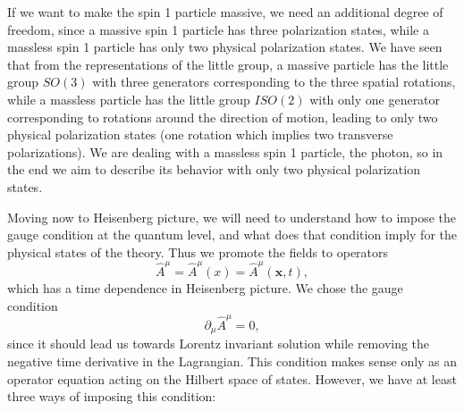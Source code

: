 If we want to make the spin 1 particle massive, we need an additional degree of freedom, since a massive spin 1 particle has three polarization states, while a massless spin 1 particle has only two physical polarization states. We have seen that from the representations of the little group, a massive particle has the little group \(SO(3)\) with three generators corresponding to the three spatial rotations, while a massless particle has the little group \(ISO(2)\) with only one generator corresponding to rotations around the direction of motion, leading to only two physical polarization states (one rotation which implies two transverse polarizations). We are dealing with a massless spin 1 particle, the photon, so in the end we aim to describe its behavior with only two physical polarization states.

Moving now to Heisenberg picture, we will need to understand how to impose the gauge condition at the quantum level, and what does that condition imply for the physical states of the theory. Thus we promote the fields to operators
\[
    \hat{A}^{\mu} = \hat{A}^{\mu}(x) = \hat{A}^{\mu}(\mathbf{x}, t),
\]
which has a time dependence in Heisenberg picture. We chose the gauge condition
\[
    \partial_\mu \hat{A}^{\mu} = 0,
\]
since it should lead us towards Lorentz invariant solution while removing the negative time derivative in the Lagrangian. This condition makes sense only as an operator equation acting on the Hilbert space of states. However, we have at least three ways of imposing this condition:
